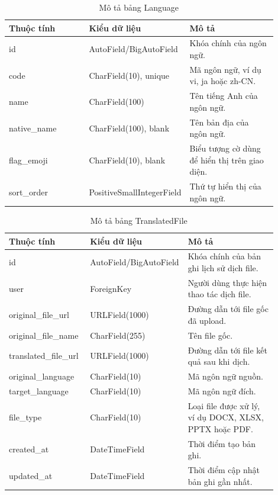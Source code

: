 ﻿\documentclass[../DoAn.tex]{subfiles}
\begin{document}
\begin{table}[H]
\centering
\caption{Mô tả bảng Language}
\label{table:db-language}
\small
\setlength{\tabcolsep}{4pt}
\renewcommand{\arraystretch}{1.18}
\begin{tabular}{|p{0.30\linewidth}|p{0.27\linewidth}|p{0.33\linewidth}|}
\hline
\textbf{Thuộc tính} & \textbf{Kiểu dữ liệu} & \textbf{Mô tả} \\ \hline
id & AutoField/BigAutoField & Khóa chính của ngôn ngữ. \\ \hline
code & CharField(10), unique & Mã ngôn ngữ, ví dụ vi, ja hoặc zh-CN. \\ \hline
name & CharField(100) & Tên tiếng Anh của ngôn ngữ. \\ \hline
native\_\allowbreak name & CharField(100), blank & Tên bản địa của ngôn ngữ. \\ \hline
flag\_\allowbreak emoji & CharField(10), blank & Biểu tượng cờ dùng để hiển thị trên giao diện. \\ \hline
sort\_\allowbreak order & PositiveSmallIntegerField & Thứ tự hiển thị của ngôn ngữ. \\ \hline
\end{tabular}
\end{table}

\begin{table}[H]
\centering
\caption{Mô tả bảng TranslatedFile}
\label{table:db-translated-file}
\small
\setlength{\tabcolsep}{4pt}
\renewcommand{\arraystretch}{1.18}
\begin{tabular}{|p{0.30\linewidth}|p{0.27\linewidth}|p{0.33\linewidth}|}
\hline
\textbf{Thuộc tính} & \textbf{Kiểu dữ liệu} & \textbf{Mô tả} \\ \hline
id & AutoField/BigAutoField & Khóa chính của bản ghi lịch sử dịch file. \\ \hline
user & ForeignKey & Người dùng thực hiện thao tác dịch file. \\ \hline
original\_\allowbreak file\_\allowbreak url & URLField(1000) & Đường dẫn tới file gốc đã upload. \\ \hline
original\_\allowbreak file\_\allowbreak name & CharField(255) & Tên file gốc. \\ \hline
translated\_\allowbreak file\_\allowbreak url & URLField(1000) & Đường dẫn tới file kết quả sau khi dịch. \\ \hline
original\_\allowbreak language & CharField(10) & Mã ngôn ngữ nguồn. \\ \hline
target\_\allowbreak language & CharField(10) & Mã ngôn ngữ đích. \\ \hline
file\_\allowbreak type & CharField(10) & Loại file được xử lý, ví dụ DOCX, XLSX, PPTX hoặc PDF. \\ \hline
created\_\allowbreak at & DateTimeField & Thời điểm tạo bản ghi. \\ \hline
updated\_\allowbreak at & DateTimeField & Thời điểm cập nhật bản ghi gần nhất. \\ \hline
\end{tabular}
\end{table}
\end{document}
